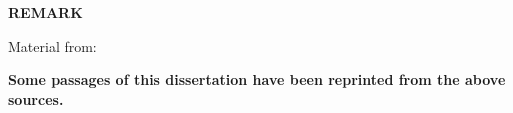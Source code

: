 \clearpage
\begin{centering}
\textbf{REMARK}\\
\vspace{\baselineskip}
\end{centering}

\vspace{\baselineskip}
Material from: 
\vspace{\baselineskip}

\begin{center}
\textbf{Some passages of this dissertation have been reprinted from the above sources.}
\end{center}
